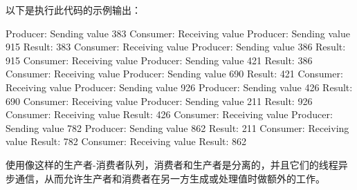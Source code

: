 以下是执行此代码的示例输出：

\begin{shell}
Producer: Sending value 383
Consumer: Receiving value
Producer: Sending value 915
Result: 383
Consumer: Receiving value
Producer: Sending value 386
Result: 915
Consumer: Receiving value
Producer: Sending value 421
Result: 386
Consumer: Receiving value
Producer: Sending value 690
Result: 421
Consumer: Receiving value
Producer: Sending value 926
Producer: Sending value 426
Result: 690
Consumer: Receiving value
Producer: Sending value 211
Result: 926
Consumer: Receiving value
Result: 426
Consumer: Receiving value
Producer: Sending value 782
Producer: Sending value 862
Result: 211
Consumer: Receiving value
Result: 782
Consumer: Receiving value
Result: 862
\end{shell}

使用像这样的生产者-消费者队列，消费者和生产者是分离的，并且它们的线程异步通信，从而允许生产者和消费者在另一方生成或处理值时做额外的工作。



